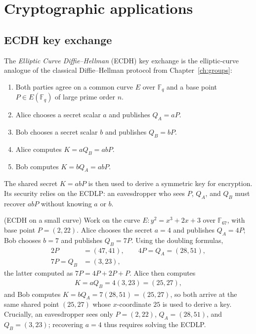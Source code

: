 \documentclass[a4paper, 12pt]{book} %
\begin{document}
\section{Cryptographic applications}

\subsection{ECDH key exchange}

The \emph{Elliptic Curve Diffie--Hellman} (ECDH) key exchange is the elliptic-curve analogue of the classical Diffie--Hellman protocol from Chapter~\ref{ch:groups}:

\begin{enumerate}
    \item Both parties agree on a common curve $E$ over $\mathbb{F}_q$ and a base point $P \in E(\mathbb{F}_q)$ of large prime order $n$.
    \item Alice chooses a secret scalar $a$ and publishes $Q_A = aP$.
    \item Bob chooses a secret scalar $b$ and publishes $Q_B = bP$.
    \item Alice computes $K = a Q_B = abP$.
    \item Bob computes $K = b Q_A = abP$.
\end{enumerate}

The shared secret $K = abP$ is then used to derive a symmetric key for encryption. Its security relies on the ECDLP: an eavesdropper who sees $P$, $Q_A$, and $Q_B$ must recover $abP$ without knowing $a$ or $b$.

\begin{example}
    (ECDH on a small curve) Work on the curve $E: y^2 = x^3 + 2x + 3$ over $\mathbb{F}_{67}$, with base point $P = (2, 22)$. Alice chooses the secret $a = 4$ and publishes $Q_A = 4P$; Bob chooses $b = 7$ and publishes $Q_B = 7P$. Using the doubling formulas,
    \begin{align}
        2P &= (47, 41), \qquad 4P = Q_A = (28, 51), \\
        7P = Q_B &= (3, 23),
    \end{align}
    the latter computed as $7P = 4P + 2P + P$. Alice then computes
    \begin{align}
        K = a Q_B = 4(3, 23) = (25, 27),
    \end{align}
    and Bob computes $K = b Q_A = 7(28, 51) = (25, 27)$, so both arrive at the same shared point $(25, 27)$ whose $x$-coordinate $25$ is used to derive a key. Crucially, an eavesdropper sees only $P = (2,22)$, $Q_A = (28,51)$, and $Q_B = (3,23)$; recovering $a = 4$ thus requires solving the ECDLP.
\end{example}
\end{document}
